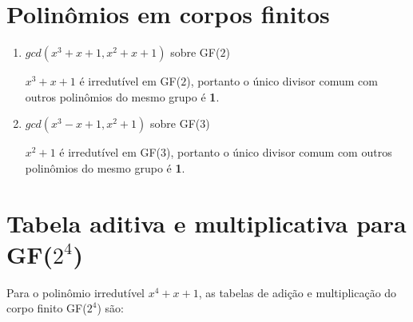 \documentclass[12pt]{article}
\begin{document}
\section{Polinômios em corpos finitos}

\begin{enumerate}[label=\textbf{\alph*})]
    \setlength\itemsep{1em}

    \item $gcd(x^{3}+x+1, x^{2}+x+1)$ sobre GF($2$)

        $x^{3}+x+1$ é irredutível em GF($2$), portanto o único divisor comum
        com outros polinômios do mesmo grupo é \textbf{1}.

    \item $gcd(x^{3}-x+1, x^{2}+1)$ sobre GF($3$)

        $x^{2}+1$ é irredutível em GF($3$), portanto o único divisor comum
        com outros polinômios do mesmo grupo é \textbf{1}.
\end{enumerate}

\section{Tabela aditiva e multiplicativa para GF($2^{4}$)}

Para o polinômio irredutível $x^{4}+x+1$, as tabelas de adição e multiplicação
do corpo finito GF($2^{4}$) são:
\end{document}
